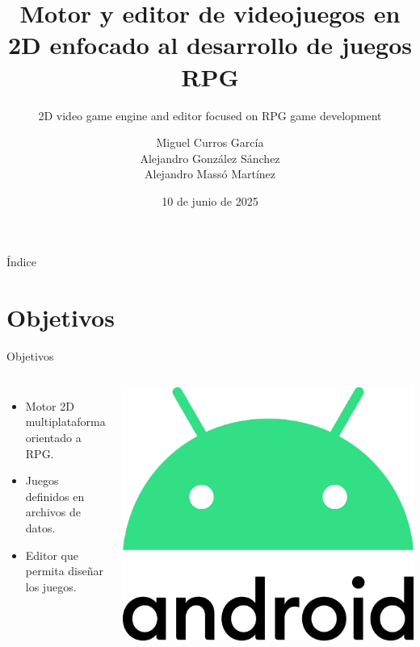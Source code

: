 \documentclass[aspectratio=169]{beamer}
\title[Motor y editor de videojuegos en 2D enfocado al desarrollo de juegos RPG]{Motor y editor de videojuegos en 2D enfocado al desarrollo de juegos RPG}
\subtitle{2D video game engine and editor focused on RPG game development}
\author[Miguel Curros, Alejandro González y Alejandro Massó]{Miguel Curros García\\ Alejandro González Sánchez\\ Alejandro Massó Martínez}
\date{10 de junio de 2025}
\begin{document}
\frame{\titlepage}

\begin{frame}{Índice}
	\tableofcontents
\end{frame}

\section{Objetivos}
\begin{frame}{Objetivos}
	\begin{columns}
		\begin{itemize}
			\item Motor 2D multiplataforma orientado a RPG.
			\item Juegos definidos en archivos de datos.
			\item Editor que permita diseñar los juegos.
		\end{itemize}
		\includegraphics[width=\textwidth]{imgs/objetivos/android.pdf}
	\end{columns}
\end{frame}
\end{document}
